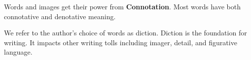 
Words and images get their power from \textbf{Connotation}. Most words have
both connotative and denotative meaning.

We refer to the author's choice of words as diction. Diction is the foundation
for writing. It impacts other writing tolls including imager, detail, and
figurative language.

\newpage
